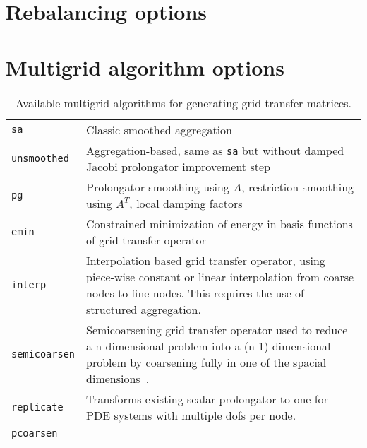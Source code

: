 

\section{Rebalancing options}
\label{sec:options_rebalancing}



\section{Multigrid algorithm options}
\label{sec:options_mg}

\begin{table}[H]
  \begin{center}
    \begin{tabular}{p{3.5cm} p{11cm}}
      \toprule
      \verb!sa!          & Classic smoothed aggregation~\cite{VMB1996} \\
      \verb!unsmoothed!  & Aggregation-based, same as \verb!sa! but without damped Jacobi prolongator improvement step \\
      \verb!pg!          & Prolongator smoothing using $A$, restriction smoothing using $A^T$, local damping factors~\cite{ST2008} \\
      \verb!emin!        & Constrained minimization of energy in basis functions of grid transfer operator~\cite{WTWG2014,OST2011} \\
      \verb!interp!      & Interpolation based grid transfer operator, using piece-wise constant or linear interpolation from coarse nodes to fine nodes. This requires the use of structured aggregation.\\
      \verb!semicoarsen! & Semicoarsening grid transfer operator used to reduce a n-dimensional problem into a (n-1)-dimensional problem by coarsening fully in one of the spacial dimensions~\cite{TPSTP2015}.\\
      \verb!replicate!      & Transforms existing scalar prolongator to one  for PDE systems with multiple dofs per node.\\
      \verb!pcoarsen!    & \\
      \bottomrule
    \end{tabular}
    \caption{Available multigrid algorithms for generating grid transfer matrices. }
\label{t:mgs}
  \end{center}
\end{table}

